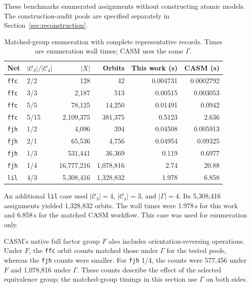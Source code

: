 \documentclass[a5paper, 10pt]{article}
\begin{document}
These benchmarks enumerated assignments without constructing atomic models. The construction-audit pools are specified separately in Section~\ref{sec:reconstruction}.

\begin{table}[H]
\centering\scriptsize
\setlength{\tabcolsep}{1.2mm}
\caption{Matched-group enumeration with complete representative records. Times are enumeration wall times; CASM uses the same $\Gamma$.}
\label{tab:matched_extra}
\begin{tabular}{llrrrr}
\toprule
Net & $|\mathcal C_3|/|\mathcal C_4|$ & $|X|$ & Orbits & This work (s) & CASM (s) \\
\midrule
\texttt{ffc} & 2/2 & 128 & 42 & 0.004731 & 0.0002792 \\
\texttt{ffc} & 3/3 & 2,187 & 513 & 0.00515 & 0.003053 \\
\texttt{ffc} & 5/5 & 78,125 & 14,250 & 0.01491 & 0.0942 \\
\texttt{ffc} & 5/15 & 2,109,375 & 381,375 & 0.5123 & 2.636 \\
\texttt{fjh} & 1/2 & 4,096 & 394 & 0.04508 & 0.005913 \\
\texttt{fjh} & 2/1 & 65,536 & 4,756 & 0.04954 & 0.09325 \\
\texttt{fjh} & 1/3 & 531,441 & 36,369 & 0.119 & 0.6977 \\
\texttt{fjh} & 1/4 & 16,777,216 & 1,078,816 & 2.74 & 20.88 \\
\texttt{lil} & 4/3 & 5,308,416 & 1,328,832 & 1.978 & 6.858 \\
\bottomrule
\end{tabular}
\end{table}

An additional \texttt{lil} case used $|\mathcal C_3|=4$, $|\mathcal C_4|=3$, and $|\Gamma|=4$. Its 5,308,416 assignments yielded 1,328,832 orbits. The wall times were 1.978\,s for this work and 6.858\,s for the matched CASM workflow. This case was used for enumeration only.

CASM's native full factor group $F$ also includes orientation-reversing operations. Under $F$, the \texttt{ffc} orbit counts matched those under $\Gamma$ for the tested pools, whereas the \texttt{fjh} counts were smaller. For \texttt{fjh} 1/4, the counts were 577,456 under $F$ and 1,078,816 under $\Gamma$. These counts describe the effect of the selected equivalence group; the matched-group timings in this section use $\Gamma$ on both sides.
\end{document}
